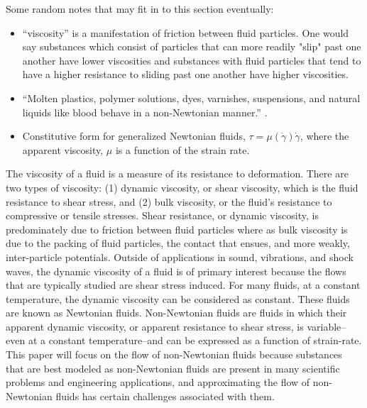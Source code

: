 \documentclass{article}
\begin{document}
{\color{red}
Some random notes that may fit in to this section eventually:
\begin{itemize}
\item ``viscosity'' is a manifestation of friction between fluid particles.
One would say substances which consist of particles that can more readily "slip" past one another have lower viscosities and substances with fluid particles that tend to have a higher resistance to sliding past one another have higher viscosities.

\item ``Molten plastics, polymer solutions, dyes, varnishes, suspensions, and natural liquids like blood behave in a non-Newtonian manner.'' \cite{bohme1987non}.

\item Constitutive form for generalized Newtonian fluids, $\tau = \mu(\dot{\gamma}) \dot{\gamma}$, where the apparent viscosity, $\mu$ is a function of the strain rate.
\end{itemize}
}

The viscosity of a fluid is a measure of its resistance to deformation.
There are two types of viscosity: (1) dynamic viscosity, or shear viscosity, which is the fluid resistance to shear stress, and (2) bulk viscosity, or the fluid's resistance to compressive or tensile stresses.
Shear resistance, or dynamic viscosity, is predominately due to friction between fluid particles where as bulk viscosity is due to the packing of fluid particles, the contact that ensues, and more weakly, inter-particle potentials. %
Outside of applications in sound, vibrations, and shock waves, the dynamic viscosity of a fluid is of primary interest because the flows that are typically studied are shear stress induced.
For many fluids, at a constant temperature, the dynamic viscosity can be considered as constant.
These fluids are known as Newtonian fluids.
Non-Newtonian fluids are fluids in which their apparent dynamic viscosity, or apparent resistance to shear stress, is variable--even at a constant temperature--and can be expressed as a function of strain-rate.
This paper will focus on the flow of non-Newtonian fluids because substances that are best modeled as non-Newtonian fluids are present in many scientific problems and engineering applications, and approximating the flow of non-Newtonian fluids has certain challenges associated with them.
\end{document}

